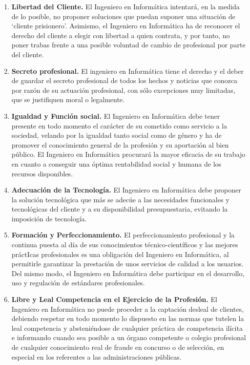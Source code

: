 \begin{enumerate}[label=\textbf{\arabic*.}]
    \item\textbf{Libertad del Cliente.} El Ingeniero en Informática intentará, en la medida de lo posible, no proponer soluciones que puedan suponer una situación de `cliente prisionero'. Asimismo, el Ingeniero en Informática ha de reconocer el derecho del cliente a elegir con libertad a quien contrata, y por tanto, no poner trabas frente a una posible voluntad de cambio de profesional por parte del cliente.
    \item\textbf{Secreto profesional.} El ingeniero en Informática tiene el derecho y el deber de guardar el secreto profesional de todos los hechos y noticias que conozca por razón de su actuación profesional, con sólo excepciones muy limitadas, que se justifiquen moral o legalmente.
    \item\textbf{Igualdad y Función social.} El Ingeniero en Informática debe tener presente en todo momento el carácter de su cometido como servicio a la sociedad, velando por la igualdad tanto social como de género y ha de promover el conocimiento general de la profesión y su aportación al bien público. El Ingeniero en Informática procurará la mayor eficacia de su trabajo en cuanto a conseguir una óptima rentabilidad social y humana de los recursos disponibles.
    \item\textbf{Adecuación de la Tecnología.} El Ingeniero en Informática debe proponer la solución tecnológica que más se adecúe a las necesidades funcionales y tecnológicas del cliente y a su disponibilidad presupuestaria, evitando la imposición de tecnología.
    \item\textbf{Formación y Perfeccionamiento.} El perfeccionamiento profesional y la continua puesta al día de sus conocimientos técnico-científicos y las mejores práctIcas profesionales es una obligación del Ingeniero en Informática, al permitirle garantizar la prestación de unos servicios de calidad a los usuarios. Del mismo modo, el Ingeniero en Informática debe participar en el desarrollo, uso y regulación de estándares profesionales.
    \item\textbf{Libre y Leal Competencia en el Ejercicio de la Profesión.} El Ingeniero en Informática no puede proceder a la captación desleal de clientes, debiendo respetar en todo momento lo dispuesto en las normas que tutelen la leal competencia y absteniéndose de cualquier práctica de competencia ilícita e informando cuando sea posible a un órgano competente o colegio profesional de cualquier conocimiento real de fraude en concurso o de selección, en especial en los referentes a las administraciones públicas.

\end{enumerate}
